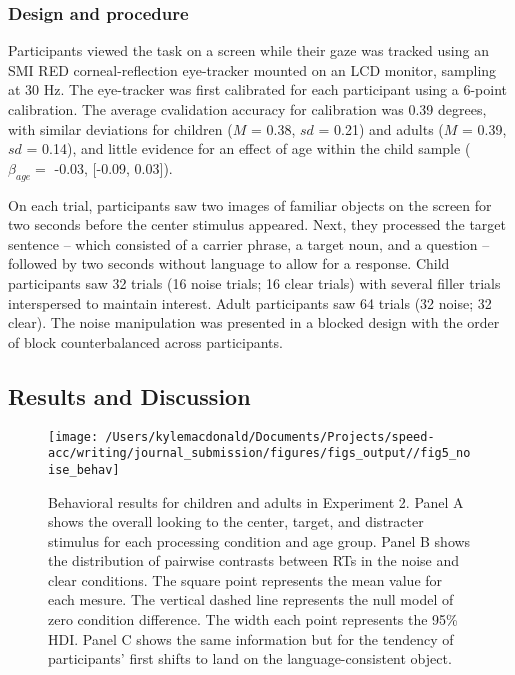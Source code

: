 \documentclass[,man,floatsintext]{apa6}
\begin{document}
\hypertarget{design-and-procedure-1}{%
\subsubsection{Design and procedure}\label{design-and-procedure-1}}

Participants viewed the task on a screen while their gaze was tracked using an SMI RED corneal-reflection eye-tracker mounted on an LCD monitor, sampling at 30 Hz. The eye-tracker was first calibrated for each participant using a 6-point calibration. The average cvalidation accuracy for calibration was 0.39 degrees, with similar deviations for children (\(M\) = 0.38, \(sd\) = 0.21) and adults (\(M\) = 0.39, \(sd\) = 0.14), and little evidence for an effect of age within the child sample (\(\beta_{age} =\) -0.03, {[}-0.09, 0.03{]}).

On each trial, participants saw two images of familiar objects on the screen for two seconds before the center stimulus appeared. Next, they processed the target sentence -- which consisted of a carrier phrase, a target noun, and a question -- followed by two seconds without language to allow for a response. Child participants saw 32 trials (16 noise trials; 16 clear trials) with several filler trials interspersed to maintain interest. Adult participants saw 64 trials (32 noise; 32 clear). The noise manipulation was presented in a blocked design with the order of block counterbalanced across participants.

\hypertarget{results-and-discussion}{%
\subsection{Results and Discussion}\label{results-and-discussion}}

\begin{figure}[!t]

{\centering \texttt{[image: /Users/kylemacdonald/Documents/Projects/speed-acc/writing/journal\_submission/figures/figs\_output//fig5\_noise\_behav]} 

}

\caption{Behavioral results for children and adults in Experiment 2. Panel A shows the overall looking to the center, target, and distracter stimulus for each processing condition and age group. Panel B shows the distribution of pairwise contrasts between RTs in the noise and clear conditions. The square point represents the mean value for each mesure. The vertical dashed line represents the null model of zero condition difference. The width each point represents the 95\% HDI. Panel C shows the same information but for the tendency of participants' first shifts to land on the language-consistent object.}\label{fig:noise-acc-rt-plot}
\end{figure}
\end{document}
